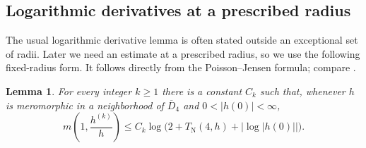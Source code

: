 \documentclass[12pt,letterpaper,reqno]{amsart}
\newtheorem{lem}[thm]{Lemma}
\theoremstyle{definition}
\numberwithin{equation}{section}
\newcommand{\TN}{T_{\mathrm N}}
\begin{document}
\subsection{Logarithmic derivatives at a prescribed radius}

The usual logarithmic derivative lemma is often stated outside an exceptional
set of radii. Later we need an estimate at a prescribed radius, so we use the
following fixed-radius form. It follows directly from the Poisson--Jensen
formula; compare \cite[Chapter~3]{Hay64}.

\begin{lem}\label{lem:logderivbound}
For every integer \(k\ge1\) there is a constant \(C_k\) such that, whenever
\(h\) is meromorphic in a neighborhood of \(\overline D_4\) and
\(0<|h(0)|<\infty\),
\begin{equation}\label{eq:logderivbound}
 m\!\left(1,\frac{h^{(k)}}h\right)
 \leq C_k\log\bigl(2+\TN(4,h)+|\log|h(0)||\bigr).
\end{equation}
\end{lem}
\end{document}
